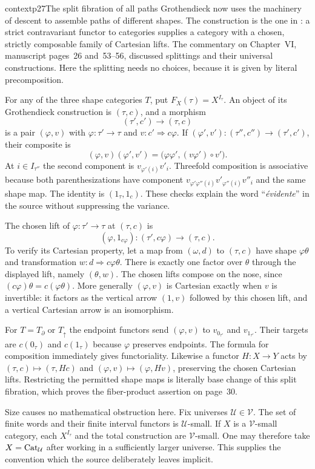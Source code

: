 \begin{dcomment}{context}{p27}{The split fibration of all paths}
Grothendieck now uses the machinery of descent to assemble paths of different shapes. The construction is the one in \citet[Expos\'e~VI, \S\S8--9]{GrothendieckSGA1}: a strict contravariant functor to categories supplies a category with a chosen, strictly composable family of Cartesian lifts. The commentary on Chapter~VI, manuscript pages~26 and~53--56, discussed splittings and their universal constructions. Here the splitting needs no choices, because it is given by literal precomposition.

For any of the three shape categories $T$, put $F_X(\tau)=X^{I_\tau}$. An object of its Grothendieck construction is $(\tau,c)$, and a morphism
\[
 (\tau',c')\longrightarrow(\tau,c)
\]
is a pair $(\varphi,v)$ with $\varphi:\tau'\to\tau$ and $v:c'\Rightarrow c\varphi$. If $(\varphi',v'):(\tau'',c'')\to(\tau',c')$, their composite is
\[
 (\varphi,v)(\varphi',v')=
 \bigl(\varphi\varphi',(v\varphi')\circ v'\bigr).
\]
At $i\in I_{\tau''}$ the second component is $v_{\varphi'(i)}v'_i$. Threefold composition is associative because both parenthesizations have component $v_{\varphi'\varphi''(i)}v'_{\varphi''(i)}v''_i$ and the same shape map. The identity is $(1_\tau,1_c)$. These checks explain the word ``\emph{\'evidente}'' in the source without suppressing the variance.

The chosen lift of $\varphi:\tau'\to\tau$ at $(\tau,c)$ is
\[
 (\varphi,1_{c\varphi}):(\tau',c\varphi)\longrightarrow(\tau,c).
\]
To verify its Cartesian property, let a map from $(\omega,d)$ to $(\tau,c)$ have shape $\varphi\theta$ and transformation $w:d\Rightarrow c\varphi\theta$. There is exactly one factor over $\theta$ through the displayed lift, namely $(\theta,w)$. The chosen lifts compose on the nose, since $(c\varphi)\theta=c(\varphi\theta)$. More generally $(\varphi,v)$ is Cartesian exactly when $v$ is invertible: it factors as the vertical arrow $(1,v)$ followed by this chosen lift, and a vertical Cartesian arrow is an isomorphism.

For $T=T_{\partial}$ or $T_{\uparrow}$ the endpoint functors send $(\varphi,v)$ to $v_{0_{\tau'}}$ and $v_{1_{\tau'}}$. Their targets are $c(0_\tau)$ and $c(1_\tau)$ because $\varphi$ preserves endpoints. The formula for composition immediately gives functoriality. Likewise a functor $H:X\to Y$ acts by $(\tau,c)\mapsto(\tau,Hc)$ and $(\varphi,v)\mapsto(\varphi,Hv)$, preserving the chosen Cartesian lifts. Restricting the permitted shape maps is literally base change of this split fibration, which proves the fiber-product assertion on page~30.

Size causes no mathematical obstruction here. Fix universes $\mathcal U\in\mathcal V$. The set of finite words and their finite interval functors is $\mathcal U$-small. If $X$ is a $\mathcal V$-small category, each $X^{I_\tau}$ and the total construction are $\mathcal V$-small. One may therefore take $X=\mathrm{Cat}_{\mathcal U}$ after working in a sufficiently larger universe. This supplies the convention which the source deliberately leaves implicit.
\end{dcomment}


